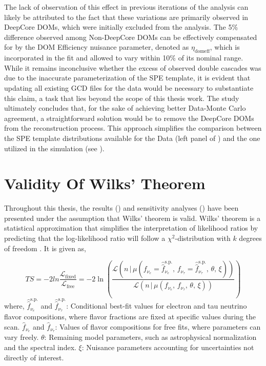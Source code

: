 The lack of observation of this effect in previous iterations of the analysis can likely be attributed to the fact that these variations are primarily observed in DeepCore DOMs, which were initially excluded from the analysis. The 5\% difference observed among Non-DeepCore DOMs can be effectively compensated for by the DOM Efficiency nuisance parameter, denoted as \(\eta_{\mathrm{domeff}}\), which is incorporated in the fit and allowed to vary within 10\% of its nominal range. While it remains inconclusive whether the excess of observed double cascades was due to the inaccurate parameterization of the SPE template, it is evident that updating all existing GCD files for the data would be necessary to substantiate this claim, a task that lies beyond the scope of this thesis work. The study ultimately concludes that, for the sake of achieving better Data-Monte Carlo agreement, a straightforward solution would be to remove the DeepCore DOMs from the reconstruction process. This approach simplifies the comparison between the SPE template distributions available for the Data (left panel of ) and the one utilized in the simulation (see ).






\chapter{Validity Of Wilks' Theorem}
\label{ch:wilks}
Throughout this thesis, the results () and sensitivity analyses () have been presented under the assumption that Wilks' theorem is valid. Wilks' theorem is a statistical approximation that simplifies the interpretation of likelihood ratios by predicting that the log-likelihood ratio will follow a \(\chi^2\)-distribution with \(k\) degrees of freedom . It is given as,



\begin{equation}\label{eq:ts_distribution}
TS = -2ln\frac{\mathcal{L}_{\text{fixed}}}{\mathcal{L}_{\text{free}}} = -2 \ln \left( \frac{\mathcal{L} \left( n \,|\, \mu \left( f_{\nu_e} = \hat{\hat{f}}_{\nu_e}^{\text{s.p.}}, \, f_{\nu_\tau} = \hat{\hat{f}}_{\nu_\tau}^{\text{s.p.}}, \, \theta, \, \xi \right) \right)}{\mathcal{L} \left( n \,|\, \mu \left( f_{\nu_e}, \, f_{\nu_\tau}, \, \theta, \, \xi \right) \right)} \right)
\end{equation}
where, \(\hat{\hat{f}}_{\nu_e}^{\text{s.p.}}\) and \(\hat{\hat{f}}_{\nu_\tau}^{\text{s.p.}}\): Conditional best-fit values for electron and tau neutrino flavor compositions, where flavor fractions are fixed at specific values during the scan. \(\hat{f}_{\nu_e}\) and \(\hat{f}_{\nu_\tau}\): Values of flavor compositions for free fits, where parameters can vary freely. \(\theta\): Remaining model parameters, such as astrophysical normalization and the spectral index. \(\xi\): Nuisance parameters accounting for uncertainties not directly of interest.

